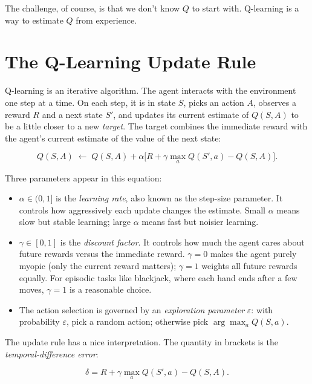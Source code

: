 \documentclass[../../book.tex]{subfiles}
\begin{document}
\noindent The challenge, of course, is that we don't know $Q$ to start with.  Q-learning is a way to estimate $Q$ from experience.

\section{The Q-Learning Update Rule}


Q-learning is an iterative algorithm.  The agent interacts with the environment one step at a time.  On each step, it is in state $S$, picks an action $A$, observes a reward $R$ and a next state $S'$, and updates its current estimate of $Q(S, A)$ to be a little closer to a new \emph{target}.  The target combines the immediate reward with the agent's current estimate of the value of the next state:

\begin{equation*}
    Q(S, A) \;\leftarrow\; Q(S, A) + \alpha \Big[ R + \gamma \max_a Q(S', a) - Q(S, A) \Big].
\end{equation*}

\noindent Three parameters appear in this equation:

\begin{itemize}
    \item $\alpha \in (0, 1]$ is the \emph{learning rate}, also known as the step-size parameter.  It controls how aggressively each update changes the estimate.  Small $\alpha$ means slow but stable learning; large $\alpha$ means fast but noisier learning.
    \item $\gamma \in [0, 1]$ is the \emph{discount factor}.  It controls how much the agent cares about future rewards versus the immediate reward.  $\gamma = 0$ makes the agent purely myopic (only the current reward matters); $\gamma = 1$ weights all future rewards equally.  For episodic tasks like blackjack, where each hand ends after a few moves, $\gamma = 1$ is a reasonable choice.
    \item The action selection is governed by an \emph{exploration parameter} $\varepsilon$: with probability $\varepsilon$, pick a random action; otherwise pick $\arg\max_a Q(S, a)$.
\end{itemize}

The update rule has a nice interpretation.  The quantity in brackets is the \emph{temporal-difference error}:

\begin{equation*}
    \delta = R + \gamma \max_a Q(S', a) - Q(S, A).
\end{equation*}
\end{document}
